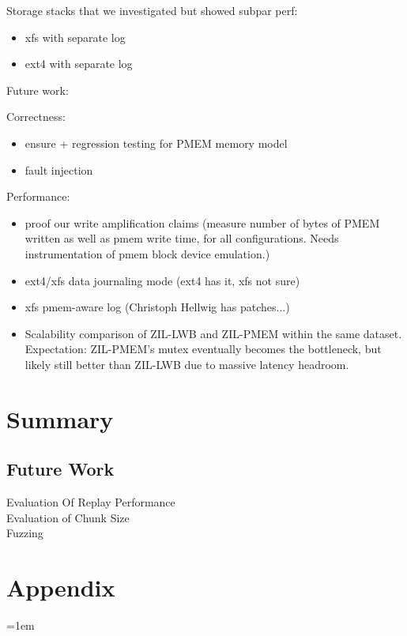 \documentclass[12pt,a4paper,twoside]{book}
\begin{document}
Storage stacks that we investigated but showed subpar perf:

\begin{itemize}
    \item xfs with separate log
    \item ext4 with separate log
\end{itemize}

Future work:

Correctness:
\begin{itemize}
    \item ensure + regression testing for PMEM memory model
    \item fault injection 
\end{itemize}

Performance:
\begin{itemize}
    \item proof our write amplification claims (measure number of bytes of PMEM written as well as pmem write time, for all configurations. Needs instrumentation of pmem block device emulation.)
    \item ext4/xfs data journaling mode (ext4 has it, xfs not sure)
    \item xfs pmem-aware log (Christoph Hellwig has patches...)
    \item Scalability comparison of ZIL-LWB and ZIL-PMEM within the same dataset.
        Expectation: ZIL-PMEM's mutex eventually becomes the bottleneck, but likely still better than ZIL-LWB due to massive latency headroom.
\end{itemize}

\chapter{Summary}\label{ch:summary}

\section{Future Work}

\begin{description}
    \item[Evaluation Of Replay Performance]
    \item[Evaluation of Chunk Size] 
    \item[Fuzzing] 

\end{description}

\backmatter

\chapter{Appendix}\label{ch:appendix}

\cleardoublepage
{}
{}
\emergencystretch=1em
\printbibliography
\end{document}
